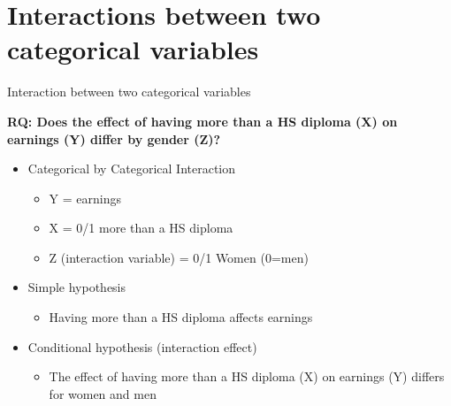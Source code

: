 \documentclass[8pt,ignorenonframetext,dvipsnames]{beamer}
\providecommand{\tightlist}{%
  \setlength{\itemsep}{0pt}\setlength{\parskip}{0pt}}
\renewcommand{\textbf}[1]{{\color{darkgray}\bfseries\fontfamily{Montserrat-TOsF}#1}}
\let\olditem\item
\renewcommand{\item}{%
  \olditem\vspace{4pt}
}
\begin{document}
\hypertarget{interactions-between-two-categorical-variables}{%
\section{Interactions between two categorical
variables}\label{interactions-between-two-categorical-variables}}

\begin{frame}{Interaction between two categorical variables}
\protect\hypertarget{interaction-between-two-categorical-variables}{}

\textbf{RQ: Does the effect of having more than a HS diploma (X) on
earnings (Y) differ by gender (Z)?}

\begin{itemize}
\tightlist
\item
  Categorical by Categorical Interaction

  \begin{itemize}
  \tightlist
  \item
    Y = earnings
  \item
    X = 0/1 more than a HS diploma
  \item
    Z (interaction variable) = 0/1 Women (0=men)
  \end{itemize}
\item
  Simple hypothesis

  \begin{itemize}
  \tightlist
  \item
    Having more than a HS diploma affects earnings
  \end{itemize}
\item
  Conditional hypothesis (interaction effect)

  \begin{itemize}
  \tightlist
  \item
    The effect of having more than a HS diploma (X) on earnings (Y)
    differs for women and men
  \end{itemize}
\end{itemize}

\end{frame}
\end{document}
